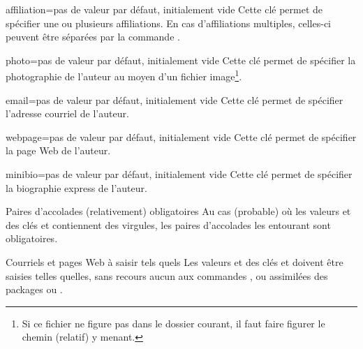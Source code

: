 \begin{docKey}{affiliation}{={}}{pas de valeur par défaut,
    initialement vide}
  Cette clé permet de spécifier une ou plusieurs affiliations. En cas
  d'affiliations multiples, celles-ci peuvent être séparées par la commande
  .
\end{docKey}

\begin{docKey}{photo}{={}}{pas de valeur par défaut,
    initialement vide}
  Cette clé permet de spécifier la photographie de l'auteur au moyen d'un
  fichier image\footnote{Si ce fichier ne figure pas dans le dossier courant, il
    faut faire figurer le chemin (relatif) y menant.}.
\end{docKey}

\begin{docKey}{email}{={}}{pas de valeur par défaut,
    initialement vide}
  Cette clé permet de spécifier l'adresse courriel de l'auteur.
\end{docKey}

\begin{docKey}{webpage}{={}}{pas de valeur par défaut,
    initialement vide}
  Cette clé permet de spécifier la page Web de l'auteur.
\end{docKey}

\begin{docKey}{minibio}{={}}{pas de valeur par défaut,
    initialement vide}
  Cette clé permet de spécifier la biographie express de l'auteur.
\end{docKey}

\begin{dbwarning}{Paires d'accolades
    (relativement) obligatoires}{}
  Au cas (probable) où les valeurs  et  des clés  et  contiennent des
  virgules, les paires d'accolades les entourant sont obligatoires.
\end{dbwarning}

\begin{dbwarning}{Courriels et pages Web à saisir tels quels}{}
  Les valeurs  et  des clés  et
   doivent être saisies telles quelles, sans recours aucun aux
  commandes ,  ou assimilées des packages
   ou .
\end{dbwarning}

